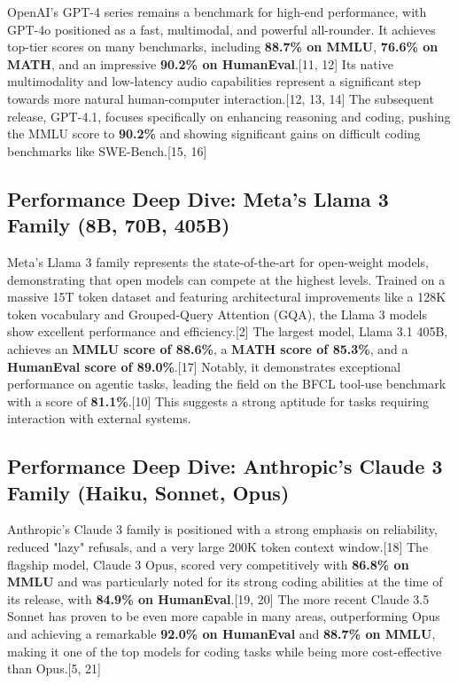 \documentclass[12pt, a4paper]{article}
\begin{document}
OpenAI's GPT-4 series remains a benchmark for high-end performance, with GPT-4o positioned as a fast, multimodal, and powerful all-rounder. It achieves top-tier scores on many benchmarks, including \textbf{88.7\% on MMLU}, \textbf{76.6\% on MATH}, and an impressive \textbf{90.2\% on HumanEval}.[11, 12] Its native multimodality and low-latency audio capabilities represent a significant step towards more natural human-computer interaction.[12, 13, 14] The subsequent release, GPT-4.1, focuses specifically on enhancing reasoning and coding, pushing the MMLU score to \textbf{90.2\%} and showing significant gains on difficult coding benchmarks like SWE-Bench.[15, 16]

\subsection{Performance Deep Dive: Meta's Llama 3 Family (8B, 70B, 405B)}

Meta's Llama 3 family represents the state-of-the-art for open-weight models, demonstrating that open models can compete at the highest levels. Trained on a massive 15T token dataset and featuring architectural improvements like a 128K token vocabulary and Grouped-Query Attention (GQA), the Llama 3 models show excellent performance and efficiency.[2] The largest model, Llama 3.1 405B, achieves an \textbf{MMLU score of 88.6\%}, a \textbf{MATH score of 85.3\%}, and a \textbf{HumanEval score of 89.0\%}.[17] Notably, it demonstrates exceptional performance on agentic tasks, leading the field on the BFCL tool-use benchmark with a score of \textbf{81.1\%}.[10] This suggests a strong aptitude for tasks requiring interaction with external systems.

\subsection{Performance Deep Dive: Anthropic's Claude 3 Family (Haiku, Sonnet, Opus)}

Anthropic's Claude 3 family is positioned with a strong emphasis on reliability, reduced "lazy" refusals, and a very large 200K token context window.[18] The flagship model, Claude 3 Opus, scored very competitively with \textbf{86.8\% on MMLU} and was particularly noted for its strong coding abilities at the time of its release, with \textbf{84.9\% on HumanEval}.[19, 20] The more recent Claude 3.5 Sonnet has proven to be even more capable in many areas, outperforming Opus and achieving a remarkable \textbf{92.0\% on HumanEval} and \textbf{88.7\% on MMLU}, making it one of the top models for coding tasks while being more cost-effective than Opus.[5, 21]
\end{document}
